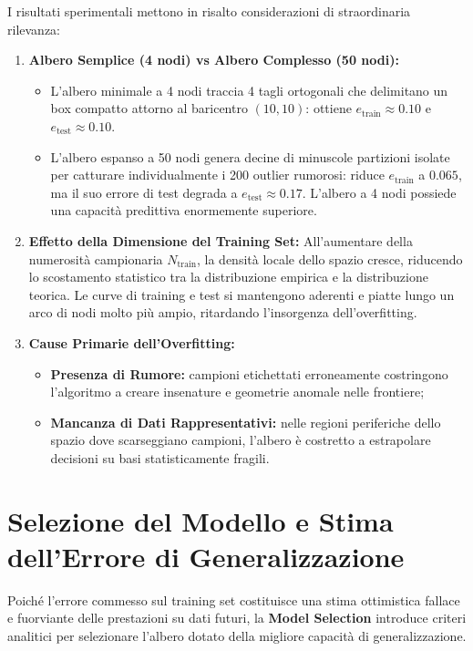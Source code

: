 I risultati sperimentali mettono in risalto considerazioni di straordinaria rilevanza:
\begin{enumerate}
    \item \textbf{Albero Semplice (4 nodi) vs Albero Complesso (50 nodi):}
    \begin{itemize}
        \item L'albero minimale a 4 nodi traccia 4 tagli ortogonali che delimitano un box compatto attorno al baricentro $(10, 10)$: ottiene $e_{\text{train}} \approx 0.10$ e $e_{\text{test}} \approx 0.10$.
        \item L'albero espanso a 50 nodi genera decine di minuscole partizioni isolate per catturare individualmente i 200 outlier rumorosi: riduce $e_{\text{train}}$ a $0.065$, ma il suo errore di test degrada a $e_{\text{test}} \approx 0.17$. L'albero a 4 nodi possiede una capacità predittiva enormemente superiore.
    \end{itemize}
    \item \textbf{Effetto della Dimensione del Training Set:}
    All'aumentare della numerosità campionaria $N_{\text{train}}$, la densità locale dello spazio cresce, riducendo lo scostamento statistico tra la distribuzione empirica e la distribuzione teorica. Le curve di training e test si mantengono aderenti e piatte lungo un arco di nodi molto più ampio, ritardando l'insorgenza dell'overfitting.
    \item \textbf{Cause Primarie dell'Overfitting:}
    \begin{itemize}
        \item \textbf{Presenza di Rumore:} campioni etichettati erroneamente costringono l'algoritmo a creare insenature e geometrie anomale nelle frontiere;
        \item \textbf{Mancanza di Dati Rappresentativi:} nelle regioni periferiche dello spazio dove scarseggiano campioni, l'albero è costretto a estrapolare decisioni su basi statisticamente fragili.
    \end{itemize}
\end{enumerate}

\FloatBarrier
\section{Selezione del Modello e Stima dell'Errore di Generalizzazione}
\label{sec:dm-model-selection}

Poiché l'errore commesso sul training set costituisce una stima ottimistica fallace e fuorviante delle prestazioni su dati futuri, la \textbf{Model Selection} introduce criteri analitici per selezionare l'albero dotato della migliore capacità di generalizzazione.

